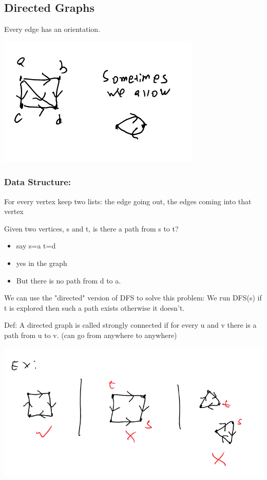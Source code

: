 \documentclass[11pt]{article}
\begin{document}
\subsection{Directed Graphs}
\label{sec:org8267d6a}
Every edge has an orientation.
\begin{center}
\includegraphics[width=.9\linewidth]{./Images/i21.png}
\end{center}

\subsubsection{Data Structure:}
\label{sec:orgc602945}
For every vertex keep two lists: the edge going out, the edges coming into that vertex

Given two vertices, s and t, is there a path from s to t?
\begin{itemize}
\item say s=a t=d
\item yes in the graph
\item But there is no path from d to a.
\end{itemize}
We can use the "directed" version of DFS to solve this problem: We run DFS(s) if t is explored then such a path exists otherwise it doesn't.

Def: A directed graph is called strongly connected if for every u and v there is a path from u to v. (can go from anywhere to anywhere)

\begin{center}
\includegraphics[width=.9\linewidth]{./Images/i22.png}
\end{center}
\end{document}
